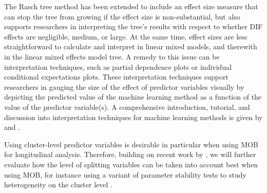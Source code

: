 \documentclass[doc,floatsintext,natbib]{apa7}
\begin{document}

The Rasch tree method has been extended to include an effect size measure that can stop the tree from growing if the effect size is non-substantial, but also supports researchers in interpreting the tree's results with respect to whether DIF effects are negligible, medium, or large. At the same time, effect sizes are less straightforward to calculate and interpret in linear mixed models, and therewith in the linear mixed effects model tree. A remedy to this issue can be interpretation techniques, such as partial dependence plots or individual conditional expectations plots. These interpretation techniques support researchers in gauging the size of the effect of predictor variables visually by depicting the predicted value of the machine learning method as a function of the value of the predictor variable(s). A comprehensive introduction, tutorial, and discussion into interpretation techniques for machine learning methods is given by \cite{Molnar2019} and \cite{Henninger2022c}. 

\color{blue} Using cluster-level predictor variables is desirable in particular when using MOB for longitudinal analysis. Therefore, building on recent work by \citet{FokkyZeil23}, we will further evaluate how the level of splitting variables can be taken into account best when using MOB, for instance using a variant of parameter stability tests to study heterogeneity on the cluster level \citep{Wang2021a}. 

\color{black}





\newpage
\appendix
\end{document}
